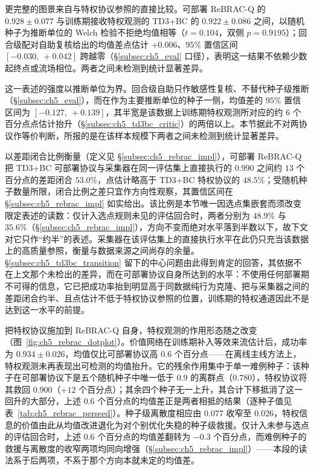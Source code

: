 更完整的图景来自与特权协议参照的直接比较。可部署 ReBRAC-Q 的 $0.928 \pm 0.077$ 与训练期接收特权观测的 TD3+BC 的 $0.922 \pm 0.086$ 之间，以随机种子为推断单位的 Welch 检验不拒绝均值相等（$t = 0.104$，双侧 $p = 0.9195$）；回合级配对自助复核给出的均值差点估计 $+0.006$、$95\%$ 置信区间 $[-0.030,\ +0.042]$ 跨越零（\S\ref{subsec:ch5_eval} 口径），表明这一结果不依赖少数起终点或流场相位。两者之间未检测到统计显著差异。

这一表述的强度以推断单位为界。回合级自助只作敏感性复核、不替代种子级推断（\S\ref{subsec:ch5_eval}），而在作为主要推断单位的种子一侧，均值差的 $95\%$ 置信区间为 $[-0.127,\ +0.139]$，其半宽是该数据上训练期特权观测所对应的约 $6$ 个百分点点估计抬升（\S\ref{subsec:ch5_td3bc_critic}）的两倍以上。本节据此不对两协议作等价判断，所报的是在该样本规模下两者之间未检测到统计显著差异。

以差距闭合比例衡量（定义见 \S\ref{subsec:ch5_rebrac_impl}），可部署 ReBRAC-Q 把 TD3+BC 可部署协议与采集器在同一评估集上直接执行的 $0.990$ 之间约 $13$ 个百分点的差距闭合 $53.0\%$，点估计略高于 TD3+BC 特权协议的 $48.5\%$；受随机种子数量所限，闭合比例之差只宜作方向性观察，其置信区间在 \S\ref{subsec:ch5_rebrac_impl} 如实给出。该比例是本节唯一因选点集嵌套而须改变限定表述的读数：仅计入选点规则未见的评估回合时，两者分别为 $48.9\%$ 与 $35.6\%$（\S\ref{subsec:ch5_rebrac_impl}），方向不变而绝对水平落到半数以下，故下文对它只作“约半”的表述。采集器在该评估集上的直接执行水平在此仍只充当该数据上的高质量参照，衡量与数据来源之间尚存的余量。\S\ref{subsec:ch5_td3bc_transition} 留下的中心问题由此得到肯定的回答，其依据不在上文那个未检出的差异，而在可部署协议自身所达到的水平：不使用任何部署期不可得的信息，它已把成功率抬到明显高于同数据纯行为克隆、把与采集器之间的差距闭合约半、且点估计不低于特权协议参照的位置，训练期的特权通道因此不是达到这一水平的前提。

把特权协议施加到 ReBRAC-Q 自身，特权观测的作用形态随之改变（图~\ref{fig:ch5_rebrac_dotplot}）。价值网络在训练期补入等效来流估计后，成功率为 $0.934 \pm 0.026$，均值仅比可部署协议高 $0.6$ 个百分点——在离线主线方法上，特权观测未再表现出可检测的均值抬升。它的残余作用集中于单一难例种子：该种子在可部署协议下是五个随机种子中唯一低于 $0.9$ 的离群点（$0.780$），特权协议将其救回 $0.900$（$+12$ 个百分点）；其余四个种子无一上升，其合计下移抵消了这一回升的大部分，上述 $0.6$ 个百分点的均值差正是两者相抵的结果（逐种子值见表~\ref{tab:ch5_rebrac_perseed}）。种子级离散度相应由 $0.077$ 收窄至 $0.026$，特权信息的价值由此从均值改进退化为对个别优化失稳的种子级救援。仅计入未参与选点的评估回合时，上述 $0.6$ 个百分点的均值差翻转为 $-0.3$ 个百分点，而难例种子的救援与离散度的收窄两项均同向增强（\S\ref{subsec:ch5_rebrac_impl}）——本段的读法系于后两项，不系于那个方向本就未定的均值差。

